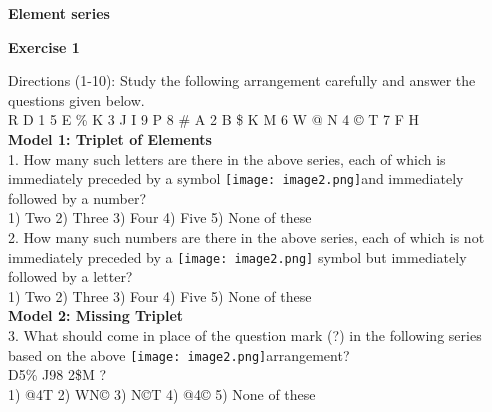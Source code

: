 \documentclass[
]{article}
\author{}
\date{}
\begin{document}
	
 

\begin{center}
	{\Large \textbf{Element series \\}}
\end{center}

{\large \textbf{Exercise 1  \\}}

Directions (1-10): Study the following arrangement carefully and answer the questions given below.\\
R D 1 5 E \% K 3 J I 9 P 8 \# A 2 B \$ K M 6 W @ N 4 © T \lambda \hspace{1mm} 7 \hspace{1mm}F \hspace{1mm}H\\

\textbf{Model 1: Triplet of Elements}\\
1. How many such letters are there in the above series, each of which is immediately preceded by a symbol \texttt{[image: image2.png]}and immediately followed by a number?\\
1) Two \hspace{2mm}2) Three \hspace{2mm}3) Four \hspace{2mm}4) Five \hspace{2mm}5) None of these\\

2. How many such numbers are there in the above series, each of which is not immediately preceded by a \texttt{[image: image2.png]}
symbol but immediately followed by a letter?\\
1) Two \hspace{2mm}2) Three \hspace{2mm}3) Four \hspace{2mm}4) Five \hspace{2mm}5) None of these\\

\textbf{Model 2: Missing Triplet}\\
3. What should come in place of the question mark (?) in the following series based on the above \texttt{[image: image2.png]}arrangement?\\ 
D5\% \hspace{1mm}J98 \hspace{1mm}2\$M ?\\
1) @4T \hspace{2mm}2) WN© \hspace{2mm}3) N©T \hspace{2mm}4) @4© \hspace{2mm}5) None of these\\
\end{document}
